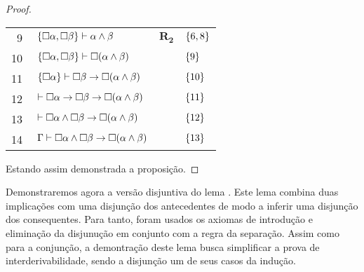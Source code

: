 \begin{tcolorbox}[enhanced jigsaw, breakable, sharp corners, colframe=black, colback=white, boxrule=0.5pt, left=1.5mm, right=1.5mm, top=1.5mm, bottom=1.5mm]
\begin{lemma}
\begin{proof}
\begin{xltabular}{\textwidth}{r | X l l}
            \scriptsize{\phantom{0}9}\phantom{ } & $\ \set{\nec\alpha,\nec\beta}\vdash\alpha\wedge\beta$                  & $\hyperref[modal.rule.2]{\mathbf{R_2}}$        & $\left\{6,8\right\}$\\[\rowskip]
            \scriptsize{10}\phantom{ }           & $\ \set{\nec\alpha,\nec\beta}\vdash\nec(\alpha\wedge\beta)$            & \phantom{1}           & $\left\{9\right\}$\\[\rowskip]
            \scriptsize{11}\phantom{ }           & $\ \set{\nec\alpha}\vdash\nec\beta\to\nec(\alpha\wedge\beta)$          &                            & $\left\{10\right\}$\\[\rowskip]
            \scriptsize{12}\phantom{ }           & $\ \vdash\nec\alpha\to\nec\beta\to\nec(\alpha\wedge\beta)$             &                            & $\left\{11\right\}$\\[\rowskip]
            \scriptsize{13}\phantom{ }           & $\ \vdash\nec\alpha\wedge\nec\beta\to\nec(\alpha\wedge\beta)$          &                          & $\left\{12\right\}$\\[\rowskip]
            \scriptsize{14}\phantom{ }           & $\ \Gamma\vdash\nec\alpha\wedge\nec\beta\to\nec(\alpha\wedge\beta)$    &                            & $\left\{13\right\}$
        \end{xltabular}
        \normalsize

        \vspace{0.5\baselineskip}
        Estando assim demonstrada a proposição.
        \end{proof}
    \end{lemma}
\end{tcolorbox}

\vspace{.5\baselineskip}
Demonstraremos agora a versão disjuntiva do lema .
Este lema combina duas implicações com uma disjunção dos antecedentes de modo a inferir uma disjunção dos consequentes.
Para tanto, foram usados os axiomas de introdução e eliminação da disjunução em conjunto com a regra da separação.
Assim como para a conjunção, a demontração deste lema busca simplificar a prova de interderivabilidade, sendo a disjunção um de seus casos da indução.

